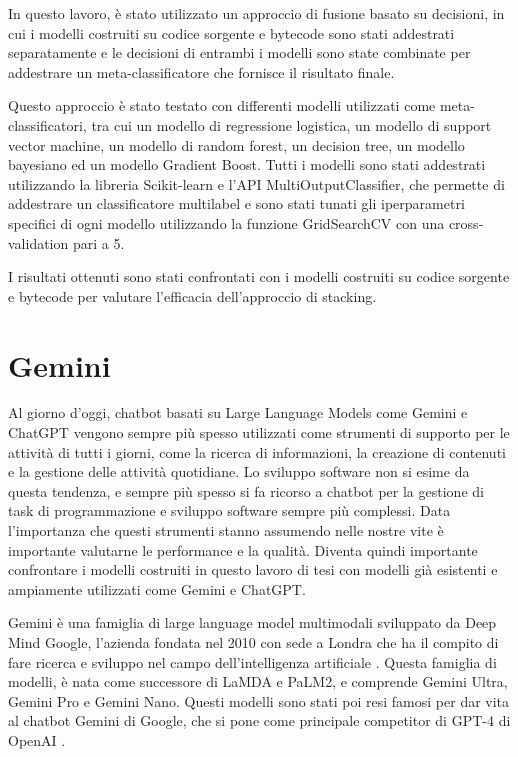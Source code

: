 \documentclass[../../Thesis.tex]{subfiles}
\begin{document}
In questo lavoro, è stato utilizzato un approccio di fusione basato su decisioni, in cui i modelli costruiti su codice sorgente e bytecode sono stati addestrati separatamente e le decisioni di entrambi i modelli sono state combinate per addestrare un meta-classificatore che fornisce il risultato finale. 

Questo approccio è stato testato con differenti modelli utilizzati come meta-classificatori, tra cui un modello di regressione logistica, un modello di support vector machine, un modello di random forest, un decision tree, un modello bayesiano ed un modello Gradient Boost. Tutti i modelli sono stati addestrati utilizzando la libreria Scikit-learn e l'API MultiOutputClassifier, che permette di addestrare un classificatore multilabel  e sono stati tunati gli iperparametri specifici di ogni modello utilizzando la funzione GridSearchCV con una cross-validation pari a 5.

I risultati ottenuti sono stati confrontati con i modelli costruiti su codice sorgente e bytecode per valutare l'efficacia dell'approccio di stacking.

\section{Gemini}
Al giorno d'oggi, chatbot basati su Large Language Models come Gemini e ChatGPT vengono sempre più spesso utilizzati come strumenti di supporto per le attività di tutti i giorni, come la ricerca di informazioni, la creazione di contenuti e la gestione delle attività quotidiane. Lo sviluppo software non si esime da questa tendenza, e sempre più spesso si fa ricorso a chatbot per la gestione di task di programmazione e sviluppo software sempre più complessi. Data l'importanza che questi strumenti stanno assumendo nelle nostre vite è importante valutarne le performance e la qualità. Diventa quindi importante confrontare i modelli costruiti in questo lavoro di tesi con modelli già esistenti e ampiamente utilizzati come Gemini e ChatGPT.

Gemini è una famiglia di large language model multimodali sviluppato da Deep Mind Google, l'azienda fondata nel 2010 con sede a Londra che ha il compito di fare ricerca e sviluppo nel campo dell'intelligenza artificiale \cite{DeepMind}. 
Questa famiglia di modelli, è nata come successore di LaMDA e PaLM2, e comprende Gemini Ultra, Gemini Pro e Gemini Nano. Questi modelli sono stati poi resi famosi per dar vita al chatbot Gemini di Google, che si pone come principale competitor di GPT-4 di OpenAI \cite{Gemini}. 
\end{document}

